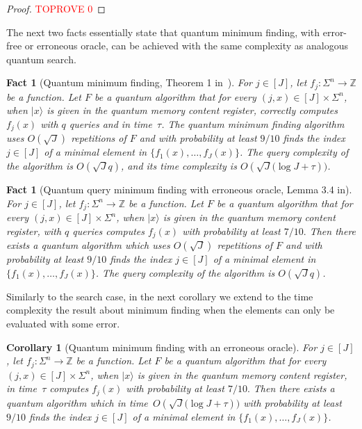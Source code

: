 \documentclass[12pt]{article}
\newcommand{\Z}{\mathbb{Z}}
\newcommand{\ket}[1]{|#1\rangle}
\newtheorem{corollary}[theorem]{Corollary}
\newtheorem{fact}[theorem]{Fact}
\theoremstyle{definition}
\begin{document}
\begin{proof}\textcolor{red}{TOPROVE 0}\end{proof}



The next two facts essentially state that quantum minimum finding, with error-free or erroneous oracle, can be achieved with the same complexity as analogous quantum search.
\begin{fact}[{\sc Quantum minimum finding}, Theorem 1 in~\cite{DH96}]
\label{fact:minimum}
For $j \in [J]$, let $f_j : \Sigma^n \rightarrow \Z$ be a function. Let $F$ be a quantum algorithm that for every $(j,x) \in [J] \times \Sigma^n$, when $\ket{x}$ is given in the quantum memory content register, correctly computes $f_j(x)$ with $q$ queries and in time~$\tau$.
The quantum minimum finding algorithm uses ${O}(\sqrt{J} )$ repetitions of $F$ and with probability at least $9/10$ finds the index $j \in [J]$ of a minimal element in $\{f_1(x), \ldots , f_J(x) \}$.
The query complexity of the algorithm is $O(\sqrt{J} q)$, and its time complexity is ${O}({\sqrt{J} ( \log J + \tau}))$.
\end{fact}

\begin{fact}[{\sc Quantum query minimum finding with erroneous oracle}, Lemma 3.4 in\cite{WY20}]
\label{fact:qmeo}
For $j \in [J]$, let $f_j : \Sigma^n \rightarrow \Z$ be a function. Let $F$ be a quantum algorithm that for every $(j,x) \in [J] \times \Sigma^n$, when $\ket{x}$ is given in the quantum memory content register, with $q$ queries computes $f_j(x)$ with probability at least $7/10.$
Then there exists a quantum algorithm which uses ${O}(\sqrt{J} )$ repetitions of $F$ and with probability at least $9/10$ finds the index $j \in [J]$ of a minimal element in $\{f_1(x), \ldots , f_J(x) \}$.
The query complexity of the algorithm is $O(\sqrt{J} q)$.
\end{fact}


Similarly to the search case, in the next corollary we extend to the time complexity the result about minimum finding when the elements can only be evaluated with some error. \\
\begin{corollary}[{\sc Quantum minimum finding with an erroneous oracle}]
\label{cor:meo}
For $j \in [J]$, let $f_j : \Sigma^n \rightarrow \Z$ be a function. Let $F$ be a quantum algorithm that for every $(j,x) \in [J] \times \Sigma^n$, when $\ket{x}$ is given in the quantum memory content register, in time~$\tau$ computes $f_j(x)$ with probability at least $7/10.$
Then there exists a quantum algorithm which in time~$O({\sqrt{J} ( \log J + \tau}))$ with probability at least $9/10$ finds the index $j \in [J]$ of a minimal element in $\{f_1(x), \ldots , f_J(x) \}$.
\end{corollary}
\end{document}
